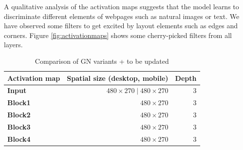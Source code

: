 A qualitative analysis of the activation maps suggests that the model learns to discriminate different elements of webpages such as natural images or text. We have observed some filters to get excited by layout elements such as edges and corners. Figure \ref{fig:activationmaps} shows some cherry-picked filters from all layers.

\begin{table}
    \centering
    \begin{tabular}{lrr}
        \textbf{Activation map} & \textbf{Spatial size (desktop, mobile)} & \textbf{Depth}\\\hline
        \textbf{Input} & $480\times270\mid480\times270$ & $3$\\
        \textbf{Block1} & $480\times270$ & $3$\\
        \textbf{Block2} & $480\times270$ & $3$\\
        \textbf{Block3} & $480\times270$ & $3$\\
        \textbf{Block4} & $480\times270$ & $3$\\
    \end{tabular}
    \caption[Comparison of GN variants]{Comparison of GN variants + to be updated}
    \label{tab:activationmaptensors}
\end{table}

